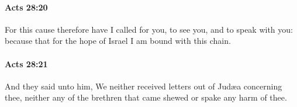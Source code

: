 		\paragraph{Acts 28:20} %
			\label{ACTS-28-20}

			For this cause therefore have I called for you, to see you, and to speak with you: because that for the hope of Israel I am bound with this chain.

			\begin{framed}
			\scriptsize
				\begin{compactdesc}
					\item[SBLG] 
				\end{compactdesc}
			\end{framed}

		\paragraph{Acts 28:21} %
			\label{ACTS-28-21}

			And they said unto him, We neither received letters out of Judæa concerning thee, neither any of the brethren that came shewed or spake any harm of thee.

